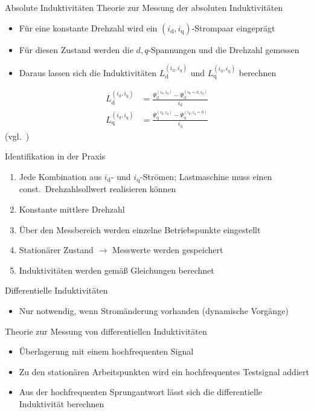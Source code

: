\documentclass{beamer}
\newcommand{\x}[1]{\mathrm{#1}}
\begin{document}
\begin{frame}[plain]{Absolute Induktivitäten}
Theorie zur Messung der absoluten Induktivitäten
\begin{itemize}
	\item Für eine konstante Drehzahl wird ein $(i_\x{d},i_\x{q})$-Strompaar eingeprägt
	\item Für diesen Zustand werden die $d,q$-Spannungen und die Drehzahl gemessen
	\item Daraus lassen sich die Induktivitäten $L_\x{d}^{(i_\x{d},i_\x{q})}$ und $L_\x{q}^{(i_\x{d},i_\x{q})}$ berechnen
\end{itemize}
\begin{align}
	L_\x{d}^{(i_\x{d},i_\x{q})}  &= \frac{\Psi_\x{d}^{(i_\x{d},i_\x{q})}-\Psi_\x{d}^{(i_\x{d}=0,i_\x{q})}}{i_\x{d}} \\
	L_\x{q}^{(i_\x{d},i_\x{q})}  &= \frac{\Psi_\x{q}^{(i_\x{d},i_\x{q})}-\Psi_\x{q}^{(i_\x{d},i_\x{q}=0)}}{i_\x{q}}
\end{align}
(vgl.~\textcite{Kellner2012})
\end{frame}

\begin{frame}{Identifikation in der Praxis}
\begin{enumerate}
	\item Jede Kombination aus $i_\x{d}$- und $i_\x{q}$-Strömen; Lastmaschine muss einen const.\ Drehzahlsollwert realisieren können
	\item Konstante mittlere Drehzahl
	\item Über den Messbereich werden einzelne Betriebspunkte eingestellt
	\item Stationärer Zustand $\rightarrow$ Messwerte werden gespeichert
	\item Induktivitäten werden gemäß Gleichungen berechnet
\end{enumerate}
\end{frame}

\begin{frame}{Differentielle Induktivitäten}
\begin{itemize}
	\item Nur notwendig, wenn Stromänderung vorhanden (dynamische Vorgänge)
\end{itemize}

Theorie zur Messung von differentiellen Induktivitäten

\begin{itemize}
	\item Überlagerung mit einem hochfrequenten Signal
	\item Zu den stationären Arbeitspunkten wird ein hochfrequentes Testsignal addiert
	\item Aus der hochfrequenten Sprungantwort lässt sich die differentielle Induktivität berechnen
\end{itemize}
\end{frame}
\end{document}
